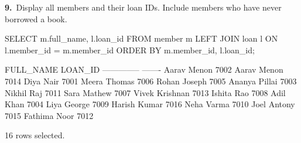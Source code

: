 \noindent\begin{minipage}{\linewidth}
\begingroup{}
{\fontsize{14}{17}\selectfont\textbf{9.}}\ Display all members and their loan IDs. Include members who have never borrowed a book.\par
\endgroup\vspace{12pt}


\begin{sqlcode}
SELECT m.full_name, l.loan_id
FROM member m
LEFT JOIN loan l ON l.member_id = m.member_id
ORDER BY m.member_id, l.loan_id;
\end{sqlcode}

\vspace{18pt}


\begin{sqlout}[fontsize=\small]
FULL_NAME       LOAN_ID
--------------  -------
Aarav Menon        7002
Aarav Menon        7014
Diya Nair          7001
Meera Thomas       7006
Rohan Joseph       7005
Ananya Pillai      7003
Nikhil Raj         7011
Sara Mathew        7007
Vivek Krishnan     7013
Ishita Rao         7008
Adil Khan          7004
Liya George        7009
Harish Kumar       7016
Neha Varma         7010
Joel Antony        7015
Fathima Noor       7012

16 rows selected.
\end{sqlout}
\end{minipage}\par\vspace{24pt}

